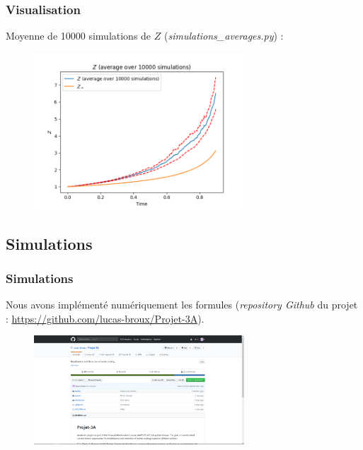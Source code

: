 \documentclass{beamer}
\begin{document}
\begin{frame}
\frametitle{Visualisation}
\par Moyenne de 10000 simulations de $Z$ (\emph{simulations\_averages.py}) : 
\begin{figure}[H]
  \centering
    \includegraphics[width=0.7\textwidth]{images/average_10000.png}
  \caption{}
\end{figure}
\end{frame}

\subsection{Simulations}

\begin{frame}
\frametitle{Simulations}
\par Nous avons implémenté numériquement les formules (\emph{repository Github} du projet : \url{https://github.com/lucas-broux/Projet-3A}).
\begin{figure}[H]
  \centering
    \includegraphics[width=0.7\textwidth]{images/github.png}
  \caption{}
\end{figure}

\end{frame}
\end{document}
